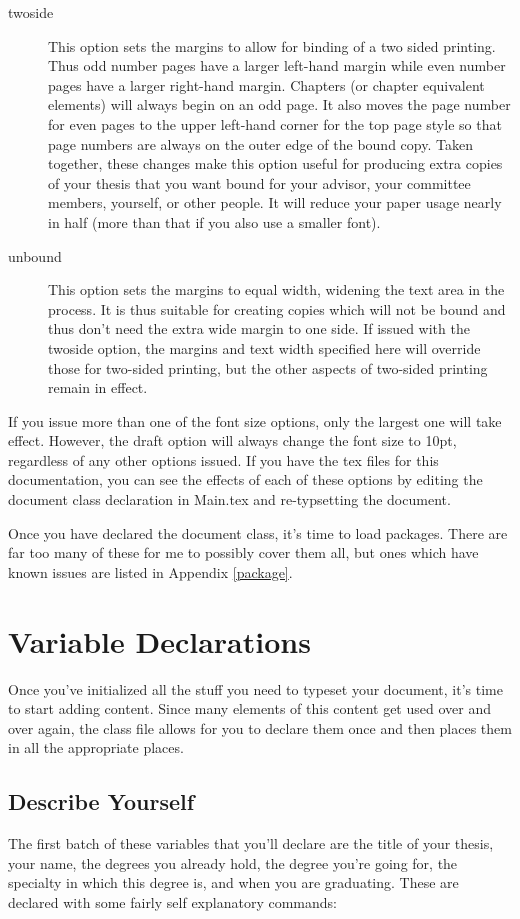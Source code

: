 \begin{description}
\item[twoside]{This option sets the margins to allow for binding of a two sided printing.  Thus odd number pages have a larger left-hand margin while even number pages have a larger right-hand margin.  Chapters (or chapter equivalent elements) will always begin on an odd page.  It also moves the page number for even pages to the upper left-hand corner for the top page style so that page numbers are always on the outer edge of the bound copy. 
Taken together, these changes make this option useful for producing extra copies of your thesis that you want bound for your advisor, your committee members, yourself, or other people.  It will reduce your paper usage nearly in half (more than that if you also use a smaller font).}
\item[unbound]{This option sets the margins to equal width, widening the text area in the process.  It is thus suitable for creating copies which will not be bound and thus don't need the extra wide margin to one side.  If issued with the twoside option, the margins and text width specified here will override those for two-sided printing, but the other aspects of two-sided printing remain in effect.}
\end{description}
If you issue more than one of the font size options, only the largest one will take effect.  However, the draft option will always change the font size to 10pt, regardless of any other options issued.  If you have the tex files for this documentation, you can see the effects of each of these options by editing the document class declaration in Main.tex and re-typsetting the document.

Once you have declared the document class, it's time to load packages.  There are far too many of these for me to possibly cover them all, but ones which have known issues are listed in Appendix \ref{package}.

\section{Variable Declarations}

Once you've initialized all the stuff you need to typeset your document, it's time to start adding content.  Since many elements of this content get used over and over again, the class file allows for you to declare them once and then places them in all the appropriate places.

\subsection{Describe Yourself}\label{self}
The first batch of these variables that you'll declare are the title of your thesis, your name, the degrees you already hold, the degree you're going for, the specialty in which this degree is, and when you are graduating.  These are declared with some fairly self explanatory commands:

